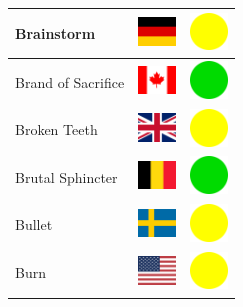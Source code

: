 \documentclass[12pt, a4paper, twoside]{report}
\begin{document}
\begin{center}
\begin{longtable}{|p{5cm}|p{2cm}|p{2cm}|}
Brainstorm & \includegraphics[width=1cm]{4x3/de} & \includegraphics[width=1cm]{likes/m} \\ \hline
Brand of Sacrifice & \includegraphics[width=1cm]{4x3/ca} & \includegraphics[width=1cm]{likes/y} \\ \hline
Broken Teeth & \includegraphics[width=1cm]{4x3/gb} & \includegraphics[width=1cm]{likes/m} \\ \hline
Brutal Sphincter & \includegraphics[width=1cm]{4x3/be} & \includegraphics[width=1cm]{likes/y} \\ \hline
Bullet & \includegraphics[width=1cm]{4x3/se} & \includegraphics[width=1cm]{likes/m} \\ \hline
Burn & \includegraphics[width=1cm]{4x3/us} & \includegraphics[width=1cm]{likes/m} \\ \hline

\end{longtable}
\end{center}
\end{document}
